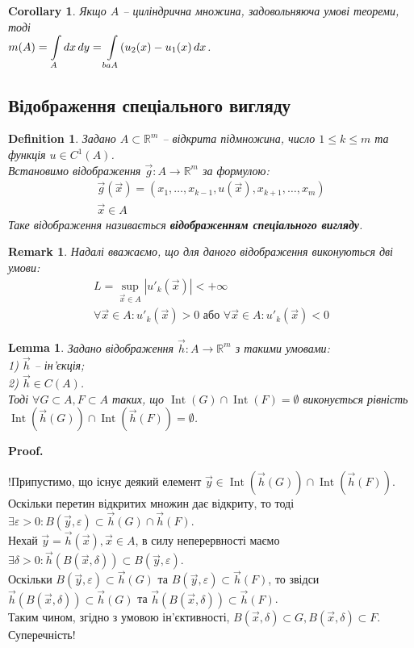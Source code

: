 \documentclass[a4paper, 10pt]{article}
\makeatletter
\def\qed{$\blacksquare$}
\theoremstyle{theoremdd}
\theoremstyle{theoremdd}
\newtheorem{definition}[theorem]{Definition}
\theoremstyle{theoremdd}
\theoremstyle{theoremdd}
\theoremstyle{theoremdd}
\theoremstyle{theoremdd}
\newtheorem{remark}[theorem]{Remark}
\theoremstyle{theoremdd}
\newtheorem{lemma}[theorem]{Lemma}
\theoremstyle{theoremdd}
\newtheorem{corollary}[theorem]{Corollary}
\renewenvironment{proof}[1][Proof.\\]{\par
\pushQED{\hfill \qed}%
\normalfont \topsep6\p@\@plus6\p@\relax
\trivlist
\item\relax
{\bfseries
#1\@addpunct{.}}\hspace\labelsep\ignorespaces
}{%
\popQED\endtrivlist\@endpefalse
}
\DeclareMathOperator{\Int}{Int}
\makeatother
\begin{document}
\begin{corollary}
Якщо $A$ -- циліндрична множина, задовольняюча умові теореми, тоді\\
$m(A) = \displaystyle\int\displaylimits_A dx\,dy = \int\displaylimits_{baA} (u_2(x)-u_1(x)\,dx$.
\end{corollary}

\subsection{Відображення спеціального вигляду}
\begin{definition}
Задано $A \subset \mathbb{R}^m$ -- відкрита підмножина, число $1 \leq k \leq m$ та функція $u \in C^{1}(A)$.\\
Встановимо відображення $\vec{g} \colon A \to \mathbb{R}^m$ за формулою:
\begin{align*}
\vec{g}(\vec{x}) = (x_1,\dots,x_{k-1},u(\vec{x}),x_{k+1},\dots,x_m) \\ \vec{x} \in A
\end{align*}
Таке відображення називається \textbf{відображенням спеціального вигляду}.
\end{definition}

\begin{remark}
Надалі вважаємо, що для даного відображення виконуються дві умови:
\begin{align*}
L = \sup_{\vec{x} \in A} |u'_k(\vec{x})| < +\infty \\
\forall \vec{x} \in A: u'_k(\vec{x}) > 0 \text{ або } \forall \vec{x} \in A: u'_k(\vec{x}) < 0
\end{align*}
\end{remark}

\begin{lemma}
Задано відображення $\vec{h} \colon A \to \mathbb{R}^m$ з такими умовами:\\
1) $\vec{h}$ -- ін'єкція;\\
2) $\vec{h} \in C(A)$.\\
Тоді $\forall G \subset A, F \subset A$ таких, що $\Int(G) \cap \Int(F) = \emptyset$ виконується рівність $\Int(\vec{h}(G)) \cap \Int(\vec{h}(F)) = \emptyset$.
\end{lemma}

\begin{proof}
!Припустимо, що існує деякий елемент $\vec{y} \in \Int(\vec{h}(G)) \cap \Int(\vec{h}(F))$. Оскільки перетин відкритих множин дає відкриту, то тоді $\exists \varepsilon > 0: B(\vec{y}, \varepsilon) \subset \vec{h}(G) \cap \vec{h}(F)$.\\
Нехай $\vec{y} = \vec{h}(\vec{x}), \vec{x} \in A$, в силу неперервності маємо $\exists \delta > 0: \vec{h}(B( \vec{x}, \delta )) \subset B(\vec{y},\varepsilon)$.\\
Оскільки $B(\vec{y},\varepsilon) \subset \vec{h}(G)$ та $B(\vec{y},\varepsilon) \subset \vec{h}(F)$, то звідси $\vec{h}(B(\vec{x},\delta)) \subset \vec{h}(G)$ та $\vec{h}(B(\vec{x},\delta)) \subset \vec{h}(F)$.\\
Таким чином, згідно з умовою ін'єктивності, $B(\vec{x},\delta) \subset G, B(\vec{x},\delta) \subset F$. Суперечність!
\end{proof}
\end{document}
